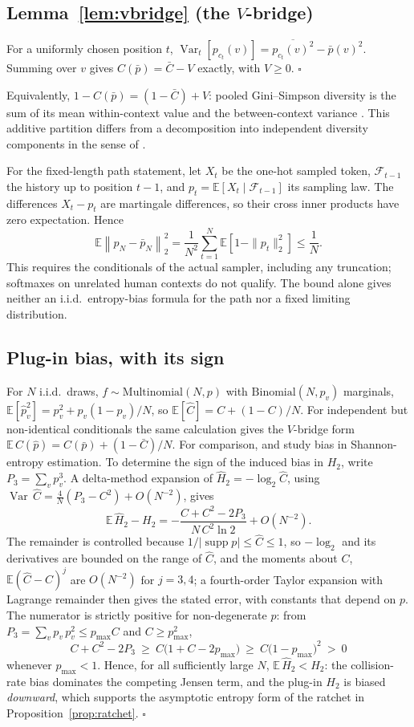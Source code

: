 \documentclass[10pt]{article}
\theoremstyle{plain}
\theoremstyle{definition}
\newcommand{\E}{\mathbb{E}}
\newcommand{\Var}{\operatorname{Var}}
\newcommand{\ph}{\hat p}
\newcommand{\Cbar}{\bar C}
\newcommand{\pbar}{\bar p}
\newcommand{\Htwo}{H_2}
\begin{document}
\subsection{Lemma~\ref{lem:vbridge} (the \texorpdfstring{$V$}{V}-bridge)}
For a uniformly chosen position $t$, $\Var_t[p_{c_t}(v)]=\overline{p_{c_t}(v)^2}-\pbar(v)^2$.
Summing over $v$ gives $C(\pbar)=\Cbar-V$ exactly, with $V\ge0$. $\square$

Equivalently, $1-C(\pbar)=(1-\Cbar)+V$: pooled Gini--Simpson diversity is the sum
of its mean within-context value and the between-context variance \citep{rao1982,lande1996}.
This additive partition differs from a decomposition into independent diversity components
in the sense of \citet{jost2007}.

For the fixed-length path statement, let $X_t$ be the one-hot sampled token, $\mathcal F_{t-1}$
the history up to position $t-1$, and $p_t=\E[X_t\mid\mathcal F_{t-1}]$ its sampling law. The
differences $X_t-p_t$ are martingale differences, so their cross inner products have zero
expectation. Hence
\[
\E\left\|\ph_N-\pbar_N\right\|_2^2
=\frac{1}{N^2}\sum_{t=1}^N\E[1-\|p_t\|_2^2]\le\frac1N.
\]
This requires the conditionals of the actual sampler, including any truncation; softmaxes on
unrelated human contexts do not qualify. The bound alone gives neither an i.i.d.\ entropy-bias
formula for the path nor a fixed limiting distribution.

\subsection{Plug-in bias, with its sign}\label{app:pluginsign} For $N$ i.i.d.\ draws, $f\sim\mathrm{Multinomial}(N,p)$ with $\mathrm{Binomial}(N,p_v)$ marginals, $\E[\ph_v^2]=p_v^2+p_v(1-p_v)/N$, so $\E[\widehat C]=C+(1-C)/N$. For independent but non-identical conditionals the same calculation gives the $V$-bridge form $\E\,C(\ph)=C(\pbar)+(1-\Cbar)/N$. For comparison, \citet{miller1955} and \citet{paninski2003} study bias in Shannon-entropy estimation. To determine the sign of the induced bias in $\Htwo$, write $P_3=\sum_v p_v^3$. A delta-method expansion of $\hat\Htwo=-\log_2\widehat C$, using $\Var\,\widehat C=\tfrac4N(P_3-C^2)+O(N^{-2})$, gives
\[
\E\,\hat\Htwo-\Htwo=-\frac{C+C^2-2P_3}{N\,C^2\ln 2}+O(N^{-2}).
\]
The remainder is controlled because $1/|\operatorname{supp}p|\le\widehat C\le1$, so $-\log_2$ and
its derivatives are bounded on the range of $\widehat C$, and the moments about $C$,
$\E(\widehat C-C)^j$ are $O(N^{-2})$ for $j=3,4$; a fourth-order Taylor expansion with Lagrange
remainder then gives the stated error, with constants that depend on $p$. The numerator is strictly
positive for non-degenerate $p$: from $P_3=\sum_v p_v\,p_v^2\le p_{\max}C$ and $C\ge p_{\max}^2$,
\[
C+C^2-2P_3\ \ge\ C\big(1+C-2p_{\max}\big)\ \ge\ C\big(1-p_{\max}\big)^2\ >\ 0
\]
whenever $p_{\max}<1$. Hence, for all sufficiently large $N$, $\E\,\hat\Htwo<\Htwo$: the
collision-rate bias dominates the competing Jensen term, and the plug-in $\Htwo$ is biased
\emph{downward}, which supports the asymptotic entropy form of the ratchet in
Proposition~\ref{prop:ratchet}. $\square$
\end{document}
